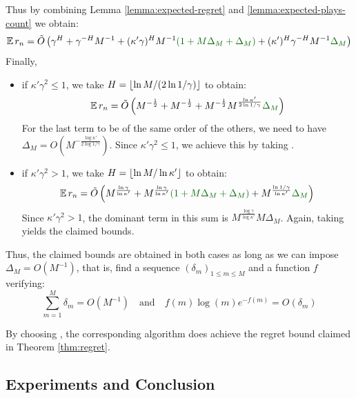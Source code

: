 Thus by combining Lemma \ref{lemma:expected-regret} and \ref{lemma:expected-plays-count} we obtain:
\begin{equation*}
\expectedvalue r_n = \tilde{O}\left(\gamma^H + \gamma^{-H}M^{-1} + (\kappa' \gamma)^{H}M^{-1}\diff{(1+M\Delta_M+\Delta_M)} + (\kappa')^H\gamma^{-H}M^{-1}\diff{\Delta_M}\right)
\end{equation*}
Finally,
\begin{itemize}
	\item if $\kappa'\gamma^2 \leq 1$, we take $H = \lfloor\ln M / (2\ln 1/\gamma)\rfloor$ to obtain:
	\begin{equation*}
	\expectedvalue r_n = \tilde{O}\left(M^{-\frac{1}{2}} + M^{-\frac{1}{2}} + M^{-\frac{1}{2}}M^{\frac{\log \kappa'}{2\log 1/\gamma}} \diff{\Delta_M}\right)
	\end{equation*}
	For the last term to be of the same order of the others, we need to have $\Delta_M = O(M^{-\frac{\log \kappa'}{2\log 1/\gamma}})$. Since $\kappa'\gamma^2 \leq 1$, we achieve this by taking .
	\item if $\kappa'\gamma^2 > 1$, we take $H = \lfloor\ln M / \ln \kappa'\rfloor$ to obtain:
	\begin{equation*}
	\expectedvalue r_n = \tilde{O}\left(M^{\frac{\log \gamma}{\log \kappa'}} + M^{\frac{\log \gamma}{\log \kappa'}}\diff{(1+M\Delta_M+\Delta_M)} + M^{\frac{\log 1/\gamma}{\log \kappa'}}\diff{\Delta_M}\right)
	\end{equation*}
	Since $\kappa'\gamma^2 > 1$, the dominant term in this sum is $M^{\frac{\log \gamma}{\log \kappa'}}M\Delta_M$. Again, taking  yields the claimed bounds.
\end{itemize}
Thus, the claimed bounds are obtained in both cases as long as we can impose $\Delta_M = O(M^{-1})$, that is, find a sequence $(\delta_m)_{1\leq m\leq M}$ and a function $f$ verifying:
\begin{equation}
\sum_{m=1}^M \delta_m = O(M^{-1})\quad \text{and}\quad f(m)\log (m) e^{-f(m)} = O(\delta_m)
\end{equation}

By choosing , the corresponding \KLOLOP algorithm does achieve the regret bound claimed in Theorem \ref{thm:regret}.


\subsection{Experiments and Conclusion}
\label{sec:planning-experiments}

